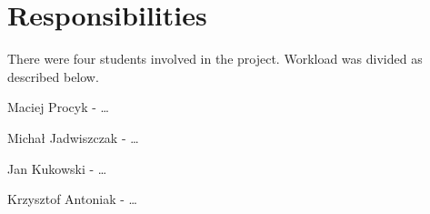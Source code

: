 \chapter{Responsibilities}
\label{chap:responsibilities}


There were four students involved in the project.
Workload was divided as described below.

Maciej Procyk - \dots

Michał Jadwiszczak - \dots

Jan Kukowski - \dots

Krzysztof Antoniak - \dots
